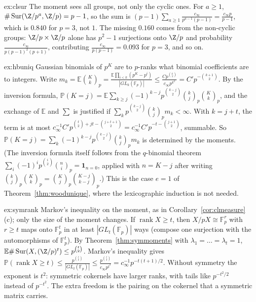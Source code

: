 \begin{solution}{ex:clsur}
\idea The moment sees all groups, not only the cyclic ones.
\writeup For $a\ge1$, $\#\operatorname{Sur}(\Z/p^a,\Z/p)=p-1$, so the sum is $(p-1)\sum_{a\ge1}\frac{c_\infty}{p^{a-1}(p-1)}=\frac{c_\infty p}{p-1}$, which is $0.840$ for $p=3$, not $1$. The missing $0.160$ comes from the non-cyclic groups: $\Z/p\times\Z/p$ alone has $p^2-1$ surjections onto $\Z/p$ and probability $\frac{c_\infty}{p(p-1)^2(p+1)}$, contributing $\frac{c_\infty}{p(p-1)}=0.093$ for $p=3$, and so on.
\end{solution}

\begin{solution}{ex:hbuniq}
\idea Gaussian binomials of $p^K$ are to $p$-ranks what binomial coefficients are to integers.
\writeup Write $m_k=\mathbb E\binom Kk_p=\frac{\mathbb E\prod_{i<k}(p^K-p^i)}{|GL_k(\mathbb F_p)|}\le\frac{Cp^{\binom k2}}{c_\infty p^{k^2}}=C'p^{-\binom{k+1}2}$. By the inversion formula, $\mathbb P(K=j)=\mathbb E\sum_{k\ge j}(-1)^{k-j}p^{\binom{k-j}2}\binom kj_p\binom Kk_p$, and the exchange of $\mathbb E$ and $\sum$ is justified if $\sum_kp^{\binom{k-j}2}\binom kj_pm_k<\infty$. With $k=j+t$, the term is at most $c_\infty^{-1}C'p^{\binom t2+jt-\binom{j+t+1}2}=c_\infty^{-1}C'p^{-t-\binom{j+1}2}$, summable. So $\mathbb P(K=j)=\sum_k(-1)^{k-j}p^{\binom{k-j}2}\binom kj_pm_k$ is determined by the moments. (The inversion formula itself follows from the $q$-binomial theorem $\sum_{i}(-1)^ip^{\binom i2}\binom ni_p=\mathbf 1_{n=0}$, applied with $n=K-j$ after writing $\binom kj_p\binom Kk_p=\binom Kj_p\binom{K-j}{k-j}_p$.) This is the case $e=1$ of Theorem~\ref{thm:woodunique}, where the lexicographic induction is not needed.
\end{solution}

\begin{solution}{ex:symrank}
\idea Markov's inequality on the moment, as in Corollary~\ref{cor:clmeasure}(c); only the size of the moment changes.
\writeup If $\operatorname{rank}X\ge t$, then $X/pX\cong\mathbb F_p^r$ with $r\ge t$ maps onto $\mathbb F_p^t$ in at least $|GL_t(\mathbb F_p)|$ ways (compose one surjection with the automorphisms of $\mathbb F_p^t$). By Theorem~\ref{thm:symmoments} with $\lambda_1=\dots=\lambda_t=1$, $\mathbb E\#\operatorname{Sur}(X,(\Z/p)^t)\le p^{\binom t2}$. Markov's inequality gives $\mathbb P(\operatorname{rank}X\ge t)\le\frac{p^{\binom t2}}{|GL_t(\mathbb F_p)|}\le\frac{p^{\binom t2}}{c_\infty p^{t^2}}=c_\infty^{-1}p^{-t(t+1)/2}$. Without symmetry the exponent is $t^2$: symmetric cokernels have larger ranks, with tails like $p^{-t^2/2}$ instead of $p^{-t^2}$. The extra freedom is the pairing on the cokernel that a symmetric matrix carries.
\end{solution}

